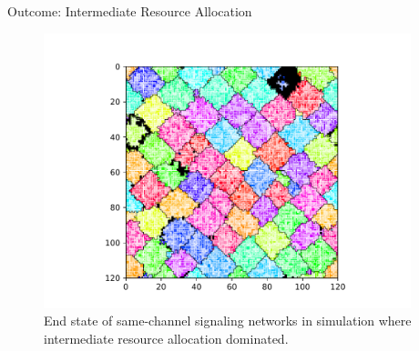 \begin{frame}{Outcome: Intermediate Resource Allocation}
\begin{figure}
\begin{columns}
\begin{column}{0.6\textwidth}
\includegraphics[width=\textwidth]{img/results/ChannelMap_1046_update24995104}
\end{column}
\begin{column}{0.4\textwidth}
\caption{
End state of same-channel signaling networks in simulation where intermediate resource allocation dominated.
}
\end{column}
\end{columns}
\end{figure}
\end{frame}

